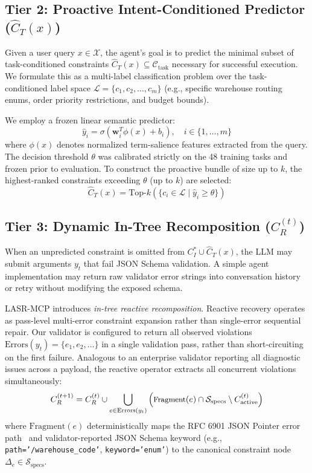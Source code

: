 \subsection{Tier 2: Proactive Intent-Conditioned Predictor ($\hat{C}_T(x)$)}
Given a user query $x \in \mathcal{X}$, the agent's goal is to predict the minimal subset of task-conditioned constraints $\hat{C}_T(x) \subseteq \mathcal{C}_{\text{task}}$ necessary for successful execution. We formulate this as a multi-label classification problem over the task-conditioned label space $\mathcal{L} = \{c_1, c_2, \dots, c_m\}$ (e.g., specific warehouse routing enums, order priority restrictions, and budget bounds).

We employ a frozen linear semantic predictor:
\begin{equation}
\hat{y}_i = \sigma\left( \mathbf{w}_i^T \phi(x) + b_i \right), \quad i \in \{1, \dots, m\}
\end{equation}
where $\phi(x)$ denotes normalized term-salience features extracted from the query. The decision threshold $\theta$ was calibrated strictly on the 48 training tasks and frozen prior to evaluation. To construct the proactive bundle of size up to $k$, the highest-ranked constraints exceeding $\theta$ (up to $k$) are selected:
\begin{equation}
\hat{C}_T(x) = \text{Top-}k \left( \{ c_i \in \mathcal{L} \mid \hat{y}_i \ge \theta \} \right)
\end{equation}

\subsection{Tier 3: Dynamic In-Tree Recomposition ($C_R^{(t)}$)}
\label{sec:recomposition}
When an unpredicted constraint is omitted from $C_I^* \cup \hat{C}_T(x)$, the LLM may submit arguments $y_t$ that fail JSON Schema validation. A simple agent implementation may return raw validator error strings into conversation history or retry without modifying the exposed schema. 

LASR-MCP introduces \textit{in-tree reactive recomposition}. Reactive recovery operates as pass-level multi-error constraint expansion rather than single-error sequential repair. Our validator is configured to return all observed violations $\text{Errors}(y_t) = \{e_1, e_2, \dots\}$ in a single validation pass, rather than short-circuiting on the first failure. Analogous to an enterprise validator reporting all diagnostic issues across a payload, the reactive operator extracts all concurrent violations simultaneously:
\begin{equation}
\label{eq:reactive_op}
\small
C_R^{(t+1)} = C_R^{(t)} \cup \bigcup_{e \in \text{Errors}(y_t)} \left( \text{Fragment}(e) \cap \mathcal{S}_{\text{specs}} \setminus C_{\text{active}}^{(t)} \right)
\end{equation}
where $\text{Fragment}(e)$ deterministically maps the RFC 6901 JSON Pointer error path~\cite{rfc6901} and validator-reported JSON Schema keyword (e.g., \texttt{path='/warehouse\_code'}, \texttt{keyword='enum'}) to the canonical constraint node $\Delta_e \in \mathcal{S}_{\text{specs}}$.

